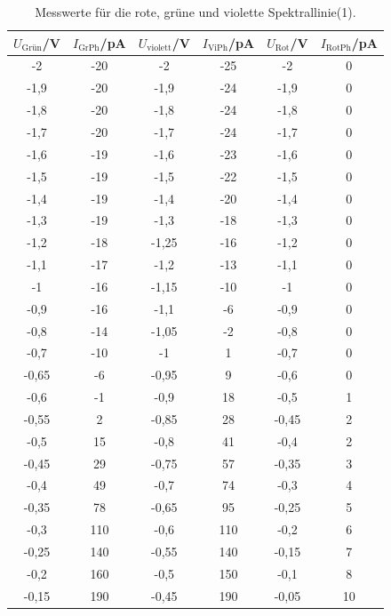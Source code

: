 \begin{table}[H]
  \centering
  \caption{Messwerte für die rote, grüne und violette Spektrallinie(1).}
  \label{tab:2VMesswerte1}
  \begin{tabular}{S[table-format=1.2] S[table-format=3] S[table-format=1.2] S[table-format=4]S[table-format=1.2]S[table-format=2]}
      \toprule
      {$U_\text{Grün}$/V}&{$I_\text{GrPh}$/pA}&{$U_\text{violett}$/V}&{$I_\text{ViPh}$/pA}&{$U_\text{Rot}$/V}&{$I_\text{RotPh}$/pA}\\
       & -20 & -2 & -25 & -2 & 0 \\
      -1,9 & -20 & -1,9 & -24 & -1,9 & 0 \\
      -1,8 & -20 & -1,8 & -24 & -1,8 & 0 \\
      -1,7 & -20 & -1,7 & -24 & -1,7 & 0 \\
      -1,6 & -19 & -1,6 & -23 & -1,6 & 0 \\
      -1,5 & -19 & -1,5 & -22 & -1,5 & 0 \\
      -1,4 & -19 & -1,4 & -20 & -1,4 & 0 \\
      -1,3 & -19 & -1,3 & -18 & -1,3 & 0 \\
      -1,2 & -18 & -1,25 & -16 & -1,2 & 0 \\
      -1,1 & -17 & -1,2 & -13 & -1,1 & 0 \\
      -1 & -16 & -1,15 & -10 & -1 & 0 \\
      -0,9 & -16 & -1,1 & -6 & -0,9 & 0 \\
      -0,8 & -14 & -1,05 & -2 & -0,8 & 0 \\
      -0,7 & -10 & -1 & 1 & -0,7 & 0 \\
      -0,65 & -6 & -0,95 & 9 & -0,6 & 0 \\
      -0,6 & -1 & -0,9 & 18 & -0,5 & 1 \\
      -0,55 & 2 & -0,85 & 28 & -0,45 & 2 \\
      -0,5 & 15 & -0,8 & 41 & -0,4 & 2 \\
      -0,45 & 29 & -0,75 & 57 & -0,35 & 3 \\
      -0,4 & 49 & -0,7 & 74 & -0,3 & 4 \\
      -0,35 & 78 & -0,65 & 95 & -0,25 & 5 \\
      -0,3 & 110 & -0,6 & 110 & -0,2 & 6 \\
      -0,25 & 140 & -0,55 & 140 & -0,15 & 7 \\
      -0,2 & 160 & -0,5 & 150 & -0,1 & 8 \\
      -0,15 & 190 & -0,45 & 190 & -0,05 & 10 \\
      \bottomrule
  \end{tabular}
\end{table}

